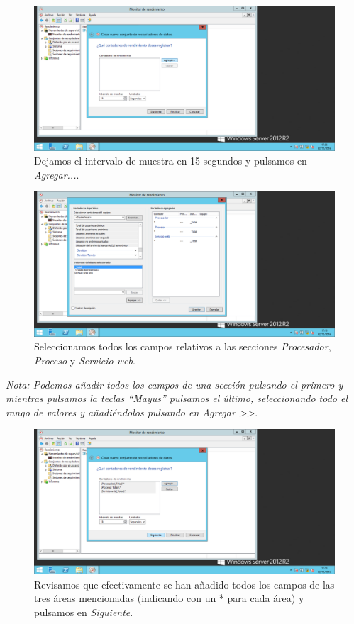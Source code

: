 \begin{figure}[H]
	\centering
	\includegraphics[scale=0.4]{recopilador-3.png}
	\caption{Dejamos el intervalo de muestra en 15 segundos y pulsamos en \textit{Agregar...}.}
\end{figure}

\begin{figure}[H]
	\centering
	\includegraphics[scale=0.4]{recopilador-4.png}
	\caption{Seleccionamos todos los campos relativos a las secciones \textit{Procesador}, \textit{Proceso} y \textit{Servicio web}. }
\end{figure}

\textit{Nota: Podemos añadir todos los campos de una sección pulsando el primero y mientras pulsamos la teclas ``Mayus'' pulsamos el último, seleccionando todo el rango de valores y añadiéndolos pulsando en Agregar \textgreater \textgreater.}

\begin{figure}[H]
	\centering
	\includegraphics[scale=0.4]{recopilador-5.png}
	\caption{Revisamos que efectivamente se han añadido todos los campos de las tres áreas mencionadas (indicando con un * para cada área) y pulsamos en \textit{Siguiente}.}
\end{figure}

